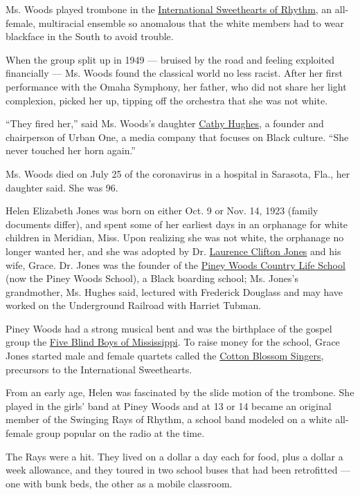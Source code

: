 Ms. Woods played trombone in the
\href{https://www.oxfordamerican.org/magazine/item/297-the-international-sweethearts-of-rhythm}{International
Sweethearts of Rhythm}, an all-female, multiracial ensemble so anomalous
that the white members had to wear blackface in the South to avoid
trouble.

When the group split up in 1949 --- bruised by the road and feeling
exploited financially --- Ms. Woods found the classical world no less
racist. After her first performance with the Omaha Symphony, her father,
who did not share her light complexion, picked her up, tipping off the
orchestra that she was not white.

``They fired her,'' said Ms. Woods's daughter
\href{http://cathyhughes.com/}{Cathy Hughes}, a founder and chairperson
of Urban One, a media company that focuses on Black culture. ``She never
touched her horn again.''

Ms. Woods died on July 25 of the coronavirus in a hospital in Sarasota,
Fla., her daughter said. She was 96.

Helen Elizabeth Jones was born on either Oct. 9 or Nov. 14, 1923 (family
documents differ), and spent some of her earliest days in an orphanage
for white children in Meridian, Miss. Upon realizing she was not white,
the orphanage no longer wanted her, and she was adopted by Dr.
\href{https://en.wikipedia.org/wiki/Laurence_C._Jones}{Laurence Clifton
Jones} and his wife, Grace. Dr. Jones was the founder of the
\href{https://www.pineywoods.org/}{Piney Woods Country Life School} (now
the Piney Woods School), a Black boarding school; Ms. Jones's
grandmother, Ms. Hughes said, lectured with Frederick Douglass and may
have worked on the Underground Railroad with Harriet Tubman.

Piney Woods had a strong musical bent and was the birthplace of the
gospel group the
\href{https://en.wikipedia.org/wiki/Five_Blind_Boys_of_Mississippi}{Five
Blind Boys of Mississippi}. To raise money for the school, Grace Jones
started male and female quartets called the
\href{https://kihm4.wordpress.com/2013/05/20/the-cotton-blossom-singers/}{Cotton
Blossom Singers}, precursors to the International Sweethearts.

From an early age, Helen was fascinated by the slide motion of the
trombone. She played in the girls' band at Piney Woods and at 13 or 14
became an original member of the Swinging Rays of Rhythm, a school band
modeled on a white all-female group popular on the radio at the time.

The Rays were a hit. They lived on a dollar a day each for food, plus a
dollar a week allowance, and they toured in two school buses that had
been retrofitted --- one with bunk beds, the other as a mobile
classroom.

